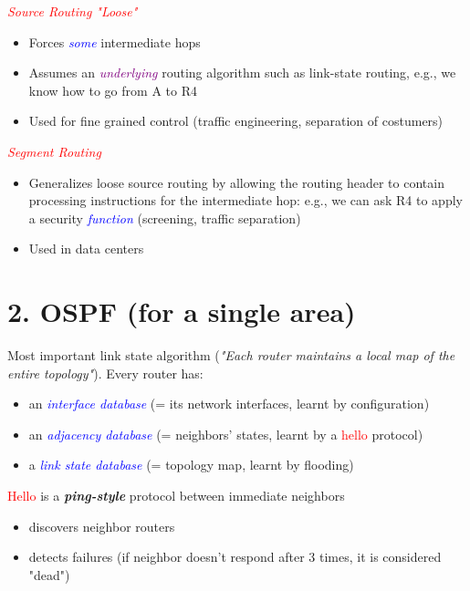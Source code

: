 \documentclass[11pt]{article}
\begin{document}
\textcolor{red}{\textit{Source Routing "Loose"}}
\begin{itemize}
	\item Forces \textcolor{blue}{\textit{some}} intermediate hops
	\item Assumes an \textcolor{purple}{\textit{underlying}} routing algorithm such as link-state routing, e.g., we know how to go from A to R4
	\item Used for fine grained control (traffic engineering, separation of costumers)
\end{itemize}

\textcolor{red}{\textit{Segment Routing}}
\begin{itemize}
	\item Generalizes loose source routing by allowing the routing header to contain processing instructions for the intermediate hop: e.g., we can ask R4 to apply a security \textcolor{blue}{\textit{function}} (screening, traffic separation)
	\item Used in data centers
\end{itemize}

\newpage

\section*{2. OSPF (for a single area)}

Most important link state algorithm (\textit{"Each router maintains a local map of the entire topology"}). Every router has:
\begin{itemize}
	\item an \textcolor{blue}{\textit{interface database}} (= its network interfaces, learnt by configuration)
	\item an \textcolor{blue}{\textit{adjacency database}} (= neighbors' states, learnt by a \textcolor{red}{hello} protocol)
	\item a \textcolor{blue}{\textit{link state database}} (= topology map, learnt by flooding)
\end{itemize}

\textcolor{red}{Hello} is a \textbf{\textit{ping-style}} protocol between immediate neighbors
\begin{itemize}
	\item discovers neighbor routers
	\item detects failures (if neighbor doesn't respond after 3 times, it is considered "dead")
\end{itemize}
\end{document}
